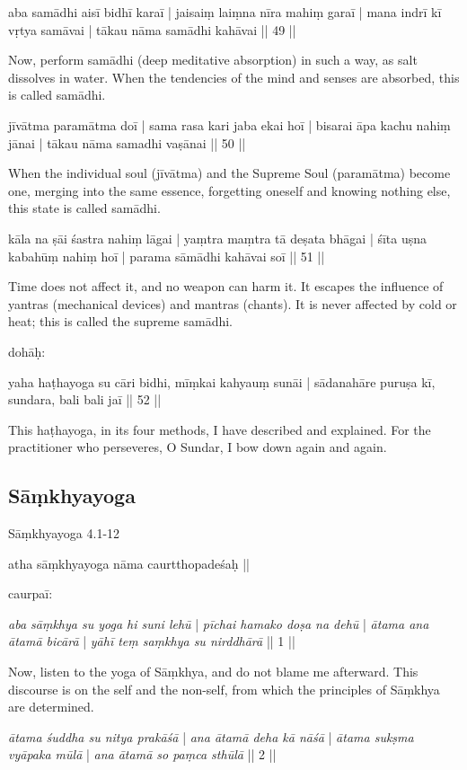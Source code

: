 aba samādhi aisī bidhī karaī | jaisaiṃ laiṃna nīra mahiṃ garaī | 
mana indrī kī vṛtya samāvai | tākau nāma samādhi kahāvai || 49 ||

Now, perform samādhi (deep meditative absorption) in such a way, as salt dissolves in water. When the tendencies of the mind and senses are absorbed, this is called samādhi.

jīvātma paramātma doī | sama rasa kari jaba ekai hoī | 
bisarai āpa kachu nahiṃ jānai | tākau nāma samadhi vaṣānai || 50 || 

When the individual soul (jīvātma) and the Supreme Soul (paramātma) become one, merging into the same essence, forgetting oneself and knowing nothing else, this state is called samādhi.

kāla na ṣāi śastra nahiṃ lāgai | yaṃtra maṃtra tā deṣata bhāgai | 
śīta uṣna kabahūṃ nahiṃ hoī | parama sāmādhi kahāvai soī || 51 || 

Time does not affect it, and no weapon can harm it. It escapes the influence of yantras (mechanical devices) and mantras (chants). It is never affected by cold or heat; this is called the supreme samādhi.

dohāḥ: 

yaha haṭhayoga su cāri bidhi, mīṃkai kahyauṃ sunāi |
sādanahāre puruṣa kī, sundara, bali bali jaī || 52 ||  

This haṭhayoga, in its four methods, I have described and explained. For the practitioner who perseveres, O Sundar, I bow down again and again. 


\subsection{Sāṃkhyayoga}
\label{samkhyayoga}

Sāṃkhyayoga 4.1-12

atha sāṃkhyayoga nāma caurtthopadeśaḥ || 

caurpaī: 

\textit{aba sāṃkhya su yoga hi suni lehū} | \textit{pīchai hamako doṣa na dehū} | 
\textit{ātama ana ātamā bicārā} | \textit{yāhī teṃ saṃkhya su nirddhārā} || 1 || 

Now, listen to the yoga of Sāṃkhya, and do not blame me afterward. This discourse is on the self and the non-self, from which the principles of Sāṃkhya are determined.

\textit{ātama śuddha su nitya prakāśā} | \textit{ana ātamā deha kā nāśā} |
\textit{ātama sukṣma vyāpaka mūlā} | \textit{ana ātamā so paṃca sthūlā} || 2 || 

